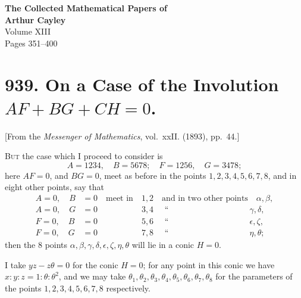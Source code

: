 \documentclass[11pt,a4paper]{article}
\theoremstyle{plain}
\begin{document}
\begin{center}
{\Large \textbf{The Collected Mathematical Papers of\\Arthur Cayley}}\\[6pt]
{\large Volume XIII}\\[12pt]
{\large Pages 351--400}\\[24pt]
\end{center}

\thispagestyle{empty}
\newpage
\setcounter{page}{351}

\section*{939. On a Case of the Involution $AF + BG + CH = 0$.}

[From the \textit{Messenger of Mathematics}, vol.~xxII. (1893), pp.~44.]

\textsc{But} the case which I proceed to consider is
\[
A = 1234, \quad B = 5678; \quad F = 1256, \quad G = 3478;
\]
here $AF = 0$, and $BG = 0$, meet as before in the points $1, 2, 3, 4, 5, 6, 7, 8$, and in
eight other points, say that
\begin{align*}
A = 0, \quad B &= 0 \quad \text{meet in} \quad 1, 2 \quad \text{and in two other points} \quad \alpha, \beta, \\
A = 0, \quad G &= 0 \quad\phantom{\text{meet in}} \quad 3, 4 \quad\,\, \text{``}\,\,\, \quad\phantom{\text{two other points}} \quad \gamma, \delta, \\
F = 0, \quad B &= 0 \quad\phantom{\text{meet in}} \quad 5, 6 \quad\,\, \text{``}\,\,\, \quad\phantom{\text{two other points}} \quad \epsilon, \zeta, \\
F = 0, \quad G &= 0 \quad\phantom{\text{meet in}} \quad 7, 8 \quad\,\, \text{``}\,\,\, \quad\phantom{\text{two other points}} \quad \eta, \theta;
\end{align*}
then the 8 points $\alpha, \beta, \gamma, \delta, \epsilon, \zeta, \eta, \theta$ will lie in a conic $H = 0$.

I take $yz - z\theta = 0$ for the conic $H = 0$; for any point in this conic we have
$x : y : z = 1 : \theta : \theta^2$, and we may take $\theta_1, \theta_2, \theta_3, \theta_4, \theta_5, \theta_6, \theta_7, \theta_8$
for the parameters of the points $1, 2, 3, 4, 5, 6, 7, 8$ respectively.
\end{document}
